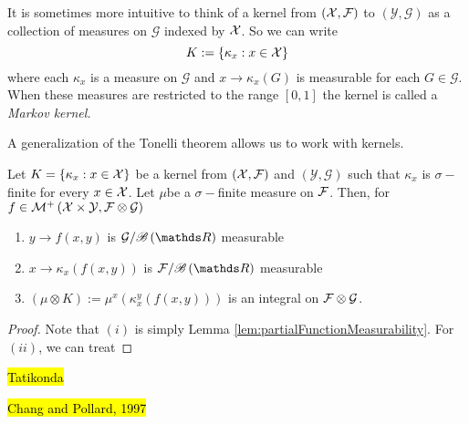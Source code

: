 \begin{rem*}
It is sometimes more intuitive to think of a kernel from $\left(\mathcal{X},\mathcal{F}\right)$
to $\left(\mathcal{Y},\mathcal{G}\right)$ as a collection of measures
on $\mathcal{G}$ indexed by $\mathcal{X}$. So we can write
\[
K:=\left\{ \kappa_{x}:x\in\mathcal{X}\right\} 
\]
where each $\kappa_{x}$ is a measure on $\mathcal{G}$ and $x\to\kappa_{x}\left(G\right)$
is measurable for each $G\in\mathcal{G}$. When these measures are
restricted to the range $\left[0,1\right]$ the kernel is called a
\emph{Markov kernel.}
\end{rem*}
A generalization of the Tonelli theorem allows us to work with kernels.
\begin{thm}
\label{thm:tonelliKernels}Let $K=\left\{ \kappa_{x}:x\in\mathcal{X}\right\} $
be a kernel from $\left(\mathcal{X},\mathcal{F}\right)$ and $\left(\mathcal{Y},\mathcal{G}\right)$
such that $\kappa_{x}$ is $\sigma-$finite for every $x\in\mathcal{X}$. Let
$\mu$be a $\sigma-$finite measure on $\mathcal{F}$. Then, for $f\in\mathcal{M}^{+}\left(\mathcal{X}\times\mathcal{Y},\mathcal{F}\otimes\mathcal{G}\right)$

\begin{enumerate}[label=(\roman*),leftmargin=.1\linewidth,rightmargin=.4\linewidth]
\item $y \to f\left(x,y\right)$ is $\mathcal{G}/\borel\left(\R\right)$ measurable
\item $x \to \kappa_x\left(f\left(x,y\right)\right)$ is $\mathcal{F}/\borel\left(\R\right)$ measurable
\item $\left(\mu \otimes K\right) := \mu^x\left(\kappa_x^y\left(f\left(x,y\right)\right)\right)$ is an integral on $\mathcal{F}\otimes\mathcal{G}$.
\end{enumerate}
\end{thm}

\begin{proof}
Note that $(i)$ is simply Lemma \ref{lem:partialFunctionMeasurability}.
For $\left(ii\right)$, we can treat
\end{proof}
\hl{Tatikonda}

\hl{Chang and Pollard, 1997}


